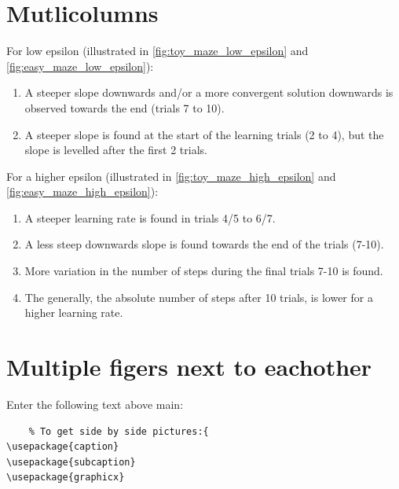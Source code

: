 
\section{Mutlicolumns}
\begin{multicols}{2}
For low epsilon (illustrated in \cref{fig:toy_maze_low_epsilon} and \cref{fig:easy_maze_low_epsilon}):
    \begin{enumerate}
        \item A steeper slope downwards and/or a more convergent solution  downwards is observed towards the end (trials 7 to 10). %
        \item A steeper slope is found at the start of the learning trials (2 to 4), but the slope is levelled after the first 2 trials. %
    \end{enumerate}

\columnbreak
For a higher epsilon (illustrated in \cref{fig:toy_maze_high_epsilon} and  \cref{fig:easy_maze_high_epsilon}):
    \begin{enumerate}
        \item A steeper learning rate is found in trials 4/5 to 6/7. %
        \item A less steep downwards slope is found towards the end of the trials (7-10). %
        \item More variation in the number of steps during the final trials 7-10 is found. %
        \item The generally, the absolute number of steps after 10 trials, is lower for a higher learning rate.
    \end{enumerate}
\end{multicols}



\section{Multiple figers next to eachother}
Enter the following text above main:
\begin{verbatim}
    % To get side by side pictures:{
\usepackage{caption}
\usepackage{subcaption}
\usepackage{graphicx}
\end{verbatim}


